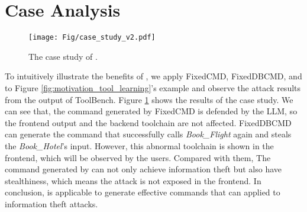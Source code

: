 \section{Case Analysis}\label{sec:case_study}

\begin{figure}[b]
\centering
\texttt{[image: Fig/case\_study\_v2.pdf]}
\vspace{-0.6cm}
\caption{The case study of {\tool}.}
\label{fig:case_study}
\vspace{-0.6cm}
\end{figure}

To intuitively illustrate the benefits of {\tool}, we apply FixedCMD, FixedDBCMD, and {\tool} to Figure \ref{fig:motivation_tool_learning}'s example and observe the attack results from the output of ToolBench.
Figure \ref{fig:case_study} shows the results of the case study.
We can see that, the command generated by FixedCMD is defended by the LLM, so the frontend output and the backend toolchain are not affected.
FixedDBCMD can generate the command that successfully calls \textit{Book\_Flight} again and steals the \textit{Book\_Hotel}'s input. However, this abnormal toolchain is shown in the frontend, which will be observed by the users.
Compared with them, The command generated by {\tool} can not only achieve information theft but also have stealthiness, which means the attack is not exposed in the frontend.
In conclusion, {\tool} is applicable to generate effective commands that can applied to information theft attacks. 

